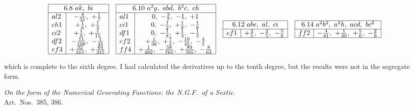 \documentclass[11pt]{article}
\begin{document}
\[
\begin{array}{|l|c|}\hline
\multicolumn{2}{|c|}{6.8\ ak,\ bi}\\\hline
al2 & -\tfrac{4}{21},\ +\tfrac{1}{7} \\
ch1 & +\tfrac{1}{6},\ +\tfrac{1}{3} \\
ci2 & +\tfrac{1}{8},\ +\tfrac{1}{15} \\
df2 & -\tfrac{11}{108},\ -\tfrac{1}{45} \\
ef3 & +\tfrac{32}{315},\ +\tfrac{64}{315} \\\hline
\end{array}\quad
\begin{array}{|l|c|}\hline
\multicolumn{2}{|c|}{6.10\ a^{2}g,\ abd,\ b^{2}c,\ ch}\\\hline
al1 & 0,\ -\tfrac{3}{7},\ -1,\ +1 \\
ci1 & 0,\ -\tfrac{1}{2},\ +\tfrac{1}{8},\ -\tfrac{1}{8} \\
df1 & 0,\ -\tfrac{1}{8},\ +\tfrac{1}{3},\ -\tfrac{1}{3} \\
ef2 & +\tfrac{1}{36},\ +\tfrac{7}{5},\ -\tfrac{19}{45},\ -\tfrac{4}{5} \\
ff4 & +\tfrac{1}{482},\ -\tfrac{58}{765},\ +\tfrac{89}{765},\ -\tfrac{8}{63} \\\hline
\end{array}\quad
\begin{array}{|l|c|}\hline
\multicolumn{2}{|c|}{6.12\ abe,\ al,\ ci}\\\hline
ef1 & +\tfrac{2}{5},\ -\tfrac{2}{5},\ -\tfrac{5}{8} \\\hline
\end{array}\quad
\begin{array}{|l|c|}\hline
\multicolumn{2}{|c|}{6.14\ a^{2}b^{2},\ a^{2}h,\ acd,\ bc^{2}}\\\hline
ff2 & -\tfrac{4}{81},\ +\tfrac{1}{30},\ +\tfrac{5}{6},\ -\tfrac{2}{9} \\\hline
\end{array}
\]

\medskip

which is complete to the sixth degree. I had calculated the derivatives up to the tenth degree, but the results were not in the segregate form.

\bigskip

\begin{center}
\textit{On the form of the Numerical Generating Functions: the N.G.F.\ of a Sextic.} \\[2pt]
Art.\ Nos.\ 385, 386.
\end{center}
\end{document}
